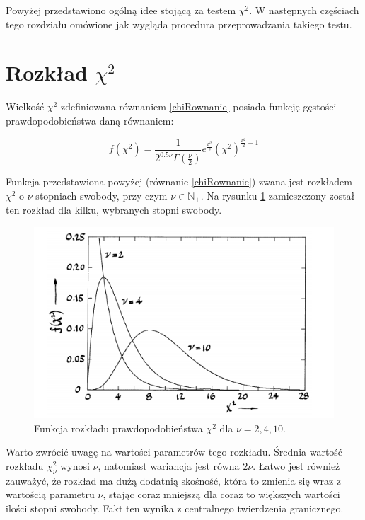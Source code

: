 Powyżej przedstawiono ogólną idee stojącą za testem $\chi^2$. W następnych częściach tego rozdziału omówione jak wygląda procedura przeprowadzania takiego testu.

\section{Rozkład $\chi^2$}

Wielkość  $\chi^2$ zdefiniowana równaniem \ref{chiRownanie} posiada funkcję gęstości prawdopodobieństwa daną równaniem: 

\begin{equation}
f(\chi^2)=\frac{1}{2^{0.5 \nu} \Gamma(\frac{\nu}{2})}e^{\frac{\nu^2}{2}} \left( \chi^2 \right)^{\frac{\nu^2}{2}-1}
\label{chi2Dis}
\end{equation}

Funkcja przedstawiona powyżej (równanie \ref{chiRownanie}) zwana jest rozkładem  $\chi^2$  o $\nu$ stopniach swobody, przy czym $\nu \in \mathbb{N}_{+}$. Na rysunku \ref{fig:chi2} zamieszczony został ten rozkład dla kilku, wybranych stopni swobody. 

\begin{figure}[h]
  \centering
  \includegraphics[scale=0.7]{rozdzial5/chi2.png}
  \caption{Funkcja rozkładu prawdopodobieństwa $\chi^2$  dla $\nu=2,4,10$.}
  \label{fig:chi2}
\end{figure}

Warto zwrócić uwagę na wartości parametrów tego rozkładu. Średnia wartość rozkładu $\chi^{2}_{\nu}$ wynosi $\nu$, natomiast wariancja jest równa $2\nu$. Łatwo jest również zauważyć, że rozkład ma dużą dodatnią skośność, która to zmienia się wraz z wartością parametru $\nu$, stając coraz mniejszą dla coraz to większych wartości ilości stopni swobody. Fakt ten wynika z centralnego twierdzenia granicznego.
